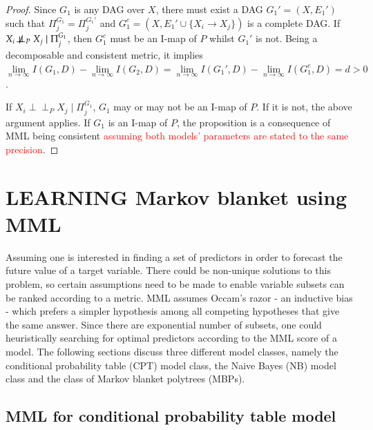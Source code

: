 \begin{proof}
Since $G_1$ is any DAG over $X$, there must exist a DAG $G_1' = (X, E_1')$ such that $\Pi_j^{G_1} = \Pi_j^{G_1'}$ and $G_1^c = (X, E_1' \cup \{X_i \rightarrow X_j\})$ is a complete DAG. If $X_i \not\!\perp\!\!\!\perp_P X_j \mid \Pi_j^{G_1}$, then $G_1^c$ must be an I-map of $P$ whilst $G_1'$ is not. Being a decomposable and consistent metric, it implies $\lim\limits_{n\rightarrow \infty}I(G_1, D) - \lim\limits_{n\rightarrow \infty} I(G_2, D) = \lim\limits_{n\rightarrow \infty}I(G_1', D) - \lim\limits_{n\rightarrow \infty} I(G_1^c, D) = d > 0$.

If $X_i \!\perp\!\!\!\perp_P X_j \mid \Pi_j^{G_1}$, $G_1$ may or may not be an I-map of $P$. If it is not, the above argument applies. If $G_1$ is an I-map of $P$, the proposition is a consequence of MML being consistent \textcolor{red}{assuming both models' parameters are stated to the same precision}. \qedwhite
\end{proof}


\section{LEARNING Markov blanket using MML}
\label{sec:mbmml}
Assuming one is interested in finding a set of predictors in order to forecast the future value of a target variable. There could be non-unique solutions to this problem, so certain assumptions need to be made to enable variable subsets can be ranked according to a metric. MML assumes Occam's razor - an inductive bias - which prefers a simpler hypothesis among all competing hypotheses that give the same answer. Since there are exponential number of subsets, one could heuristically searching for optimal predictors according to the MML score of a model. %
The following sections discuss three different model classes, namely the conditional probability table (CPT) model class, the Naive Bayes (NB) model class and the class of Markov blanket polytrees (MBPs).   


\subsection{MML for conditional probability table model}
\label{sec:mml_cpt}

